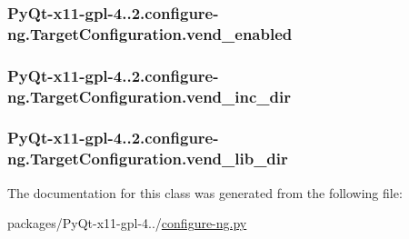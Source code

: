 \subsubsection[{vend\+\_\+enabled}]{\setlength{\rightskip}{0pt plus 5cm}Py\+Qt-\/x11-\/gpl-\/4..\+2.configure-\/ng.\+Target\+Configuration.\+vend\+\_\+enabled}\label{classPyQt-x11-gpl-4_811_82_1_1configure-ng_1_1TargetConfiguration_a7f409f9d25182e40d343887b0f214e0f}
\hypertarget{classPyQt-x11-gpl-4_811_82_1_1configure-ng_1_1TargetConfiguration_a9fe786236e42a1a34d0acd8ac6a7caff}{}
\subsubsection[{vend\+\_\+inc\+\_\+dir}]{\setlength{\rightskip}{0pt plus 5cm}Py\+Qt-\/x11-\/gpl-\/4..\+2.configure-\/ng.\+Target\+Configuration.\+vend\+\_\+inc\+\_\+dir}\label{classPyQt-x11-gpl-4_811_82_1_1configure-ng_1_1TargetConfiguration_a9fe786236e42a1a34d0acd8ac6a7caff}
\hypertarget{classPyQt-x11-gpl-4_811_82_1_1configure-ng_1_1TargetConfiguration_af1c3a8ec4a750455e3478092b388591a}{}
\subsubsection[{vend\+\_\+lib\+\_\+dir}]{\setlength{\rightskip}{0pt plus 5cm}Py\+Qt-\/x11-\/gpl-\/4..\+2.configure-\/ng.\+Target\+Configuration.\+vend\+\_\+lib\+\_\+dir}\label{classPyQt-x11-gpl-4_811_82_1_1configure-ng_1_1TargetConfiguration_af1c3a8ec4a750455e3478092b388591a}


The documentation for this class was generated from the following file\+:\begin{DoxyCompactItemize}
\item 
packages/\+Py\+Qt-\/x11-\/gpl-\/4../\hyperlink{configure-ng_8py}{configure-\/ng.\+py}\end{DoxyCompactItemize}

